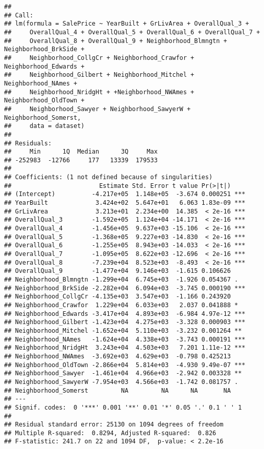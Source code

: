 \documentclass[
]{article}
\begin{document}
\begin{verbatim}
## 
## Call:
## lm(formula = SalePrice ~ YearBuilt + GrLivArea + OverallQual_3 + 
##     OverallQual_4 + OverallQual_5 + OverallQual_6 + OverallQual_7 + 
##     OverallQual_8 + OverallQual_9 + Neighborhood_Blmngtn + Neighborhood_BrkSide + 
##     Neighborhood_CollgCr + Neighborhood_Crawfor + Neighborhood_Edwards + 
##     Neighborhood_Gilbert + Neighborhood_Mitchel + Neighborhood_NAmes + 
##     Neighborhood_NridgHt + +Neighborhood_NWAmes + Neighborhood_OldTown + 
##     Neighborhood_Sawyer + Neighborhood_SawyerW + Neighborhood_Somerst, 
##     data = dataset)
## 
## Residuals:
##     Min      1Q  Median      3Q     Max 
## -252983  -12766     177   13339  179533 
## 
## Coefficients: (1 not defined because of singularities)
##                        Estimate Std. Error t value Pr(>|t|)    
## (Intercept)          -4.217e+05  1.148e+05  -3.674 0.000251 ***
## YearBuilt             3.424e+02  5.647e+01   6.063 1.83e-09 ***
## GrLivArea             3.213e+01  2.234e+00  14.385  < 2e-16 ***
## OverallQual_3        -1.592e+05  1.124e+04 -14.171  < 2e-16 ***
## OverallQual_4        -1.456e+05  9.637e+03 -15.106  < 2e-16 ***
## OverallQual_5        -1.368e+05  9.227e+03 -14.830  < 2e-16 ***
## OverallQual_6        -1.255e+05  8.943e+03 -14.033  < 2e-16 ***
## OverallQual_7        -1.095e+05  8.622e+03 -12.696  < 2e-16 ***
## OverallQual_8        -7.239e+04  8.523e+03  -8.493  < 2e-16 ***
## OverallQual_9        -1.477e+04  9.146e+03  -1.615 0.106626    
## Neighborhood_Blmngtn -1.299e+04  6.745e+03  -1.926 0.054367 .  
## Neighborhood_BrkSide -2.282e+04  6.094e+03  -3.745 0.000190 ***
## Neighborhood_CollgCr -4.135e+03  3.547e+03  -1.166 0.243920    
## Neighborhood_Crawfor  1.229e+04  6.033e+03   2.037 0.041888 *  
## Neighborhood_Edwards -3.417e+04  4.893e+03  -6.984 4.97e-12 ***
## Neighborhood_Gilbert -1.423e+04  4.275e+03  -3.328 0.000903 ***
## Neighborhood_Mitchel -1.652e+04  5.110e+03  -3.232 0.001264 ** 
## Neighborhood_NAmes   -1.624e+04  4.338e+03  -3.743 0.000191 ***
## Neighborhood_NridgHt  3.243e+04  4.503e+03   7.201 1.11e-12 ***
## Neighborhood_NWAmes  -3.692e+03  4.629e+03  -0.798 0.425213    
## Neighborhood_OldTown -2.866e+04  5.814e+03  -4.930 9.49e-07 ***
## Neighborhood_Sawyer  -1.461e+04  4.966e+03  -2.942 0.003328 ** 
## Neighborhood_SawyerW -7.954e+03  4.566e+03  -1.742 0.081757 .  
## Neighborhood_Somerst         NA         NA      NA       NA    
## ---
## Signif. codes:  0 '***' 0.001 '**' 0.01 '*' 0.05 '.' 0.1 ' ' 1
## 
## Residual standard error: 25130 on 1094 degrees of freedom
## Multiple R-squared:  0.8294, Adjusted R-squared:  0.826 
## F-statistic: 241.7 on 22 and 1094 DF,  p-value: < 2.2e-16
\end{verbatim}
\end{document}
